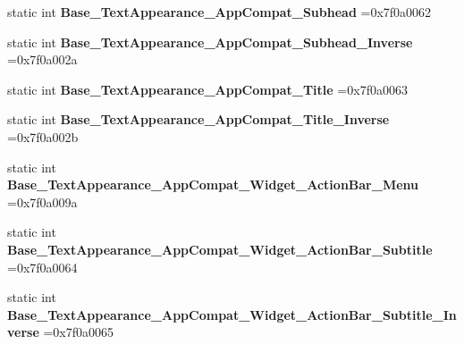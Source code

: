 \begin{DoxyCompactItemize}
\mbox{\label{classandroid_1_1support_1_1v7_1_1mediarouter_1_1R_1_1style_a7d9e60edeec068e15f3b278640de79db}} 
static int {\bfseries Base\+\_\+\+Text\+Appearance\+\_\+\+App\+Compat\+\_\+\+Subhead} =0x7f0a0062
\item 
\mbox{\label{classandroid_1_1support_1_1v7_1_1mediarouter_1_1R_1_1style_a68dd426c12ee55372cad2fb0e659ef20}} 
static int {\bfseries Base\+\_\+\+Text\+Appearance\+\_\+\+App\+Compat\+\_\+\+Subhead\+\_\+\+Inverse} =0x7f0a002a
\item 
\mbox{\label{classandroid_1_1support_1_1v7_1_1mediarouter_1_1R_1_1style_a8aa0ad5a87c50999873ada29da3f65d5}} 
static int {\bfseries Base\+\_\+\+Text\+Appearance\+\_\+\+App\+Compat\+\_\+\+Title} =0x7f0a0063
\item 
\mbox{\label{classandroid_1_1support_1_1v7_1_1mediarouter_1_1R_1_1style_a7f67c68a91be9b258e7c94b9a4658ef1}} 
static int {\bfseries Base\+\_\+\+Text\+Appearance\+\_\+\+App\+Compat\+\_\+\+Title\+\_\+\+Inverse} =0x7f0a002b
\item 
\mbox{\label{classandroid_1_1support_1_1v7_1_1mediarouter_1_1R_1_1style_a19f30b63ecc74f2dd11a6952f7f2c466}} 
static int {\bfseries Base\+\_\+\+Text\+Appearance\+\_\+\+App\+Compat\+\_\+\+Widget\+\_\+\+Action\+Bar\+\_\+\+Menu} =0x7f0a009a
\item 
\mbox{\label{classandroid_1_1support_1_1v7_1_1mediarouter_1_1R_1_1style_a58d9d7f6fa41325ab4573facdb2fc45c}} 
static int {\bfseries Base\+\_\+\+Text\+Appearance\+\_\+\+App\+Compat\+\_\+\+Widget\+\_\+\+Action\+Bar\+\_\+\+Subtitle} =0x7f0a0064
\item 
\mbox{\label{classandroid_1_1support_1_1v7_1_1mediarouter_1_1R_1_1style_afd2c1b4caaca12c8c4e0dcb4acf17727}} 
static int {\bfseries Base\+\_\+\+Text\+Appearance\+\_\+\+App\+Compat\+\_\+\+Widget\+\_\+\+Action\+Bar\+\_\+\+Subtitle\+\_\+\+Inverse} =0x7f0a0065

\end{DoxyCompactItemize}
